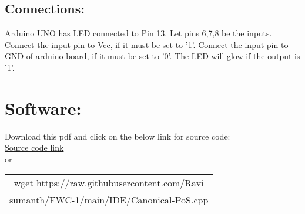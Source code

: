 \documentclass[a4paper,12pt,twocolumn]{article}
\begin{document}
\subsection{Connections:}
Arduino UNO has LED connected to Pin 13. Let pins 6,7,8 be the inputs. Connect the input pin to Vcc, if it must be set to '1'. Connect the input pin to GND of arduino board, if it must be set to '0'. The LED will glow if the output is '1'. 
\section{Software:}
Download this pdf and click on the below link for source code:\\
\href{https://raw.githubusercontent.com/Ravisumanth/FWC-1/main/IDE/Canonical-PoS.cpp}{Source code link}\\or\\ \newline \begin{tabular}{|c|}
\hline
wget https://raw.githubusercontent.com/Ravi\\sumanth/FWC-1/main/IDE/Canonical-PoS.cpp
\\ \hline
\end{tabular}
\end{document}
